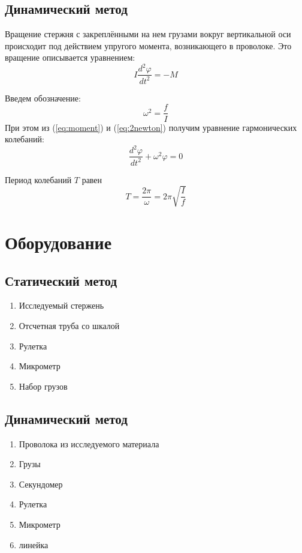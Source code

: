 \documentclass[a4paper, 12pt]{article}
\begin{document}
\subsection{Динамический метод}

Вращение стержня с закреплёнными на нем грузами вокруг вертикальной оси происходит под действием упругого момента,
возникающего в проволоке. Это вращение описывается уравнением:
\begin{equation} \label{eq:2newton}
I \frac{d^2\varphi}{dt^2} = -M
\end{equation}

Введем обозначение:
\[
\omega^2 = \frac{f}{I}
\]
При этом из (\ref{eq:moment}) и (\ref{eq:2newton}) получим уравнение гармонических колебаний:
\[
\frac{d^2\varphi}{dt^2} + \omega^2\varphi = 0
\]

Период колебаний $T$ равен
\[
T = \frac{2\pi}{\omega} = 2\pi \sqrt{\frac{I}{f}}
\]

\section{Оборудование}

\subsection{Статический метод}

\begin{enumerate}
	\item Исследуемый стержень
	\item Отсчетная труба со шкалой
	\item Рулетка
	\item Микрометр
	\item Набор грузов
\end{enumerate}

\subsection{Динамический метод}

\begin{enumerate}
	\item Проволока из исследуемого материала
	\item Грузы
	\item Секундомер
	\item Рулетка
	\item Микрометр
	\item линейка
\end{enumerate}
\end{document}
